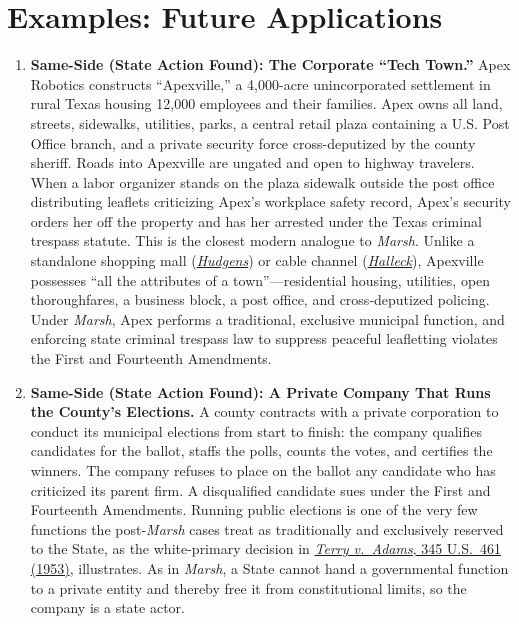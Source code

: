 \documentclass[12pt]{article}
\begin{document}
\section{Examples: Future Applications}
\begin{enumerate}

\item \textbf{Same-Side (State Action Found): The Corporate ``Tech Town.''} Apex Robotics constructs ``Apexville,'' a 4,000-acre unincorporated settlement in rural Texas housing 12,000 employees and their families. Apex owns all land, streets, sidewalks, utilities, parks, a central retail plaza containing a U.S. Post Office branch, and a private security force cross-deputized by the county sheriff. Roads into Apexville are ungated and open to highway travelers. When a labor organizer stands on the plaza sidewalk outside the post office distributing leaflets criticizing Apex's workplace safety record, Apex's security orders her off the property and has her arrested under the Texas criminal trespass statute. This is the closest modern analogue to \textit{Marsh}. Unlike a standalone shopping mall (\href{https://supreme.justia.com/cases/federal/us/424/507/}{\textit{Hudgens}}) or cable channel (\href{https://supreme.justia.com/cases/federal/us/587/17-1702/}{\textit{Halleck}}), Apexville possesses ``all the attributes of a town''---residential housing, utilities, open thoroughfares, a business block, a post office, and cross-deputized policing. Under \textit{Marsh}, Apex performs a traditional, exclusive municipal function, and enforcing state criminal trespass law to suppress peaceful leafletting violates the First and Fourteenth Amendments.

\item \textbf{Same-Side (State Action Found): A Private Company That Runs the County's Elections.} A county contracts with a private corporation to conduct its municipal elections from start to finish: the company qualifies candidates for the ballot, staffs the polls, counts the votes, and certifies the winners. The company refuses to place on the ballot any candidate who has criticized its parent firm. A disqualified candidate sues under the First and Fourteenth Amendments. Running public elections is one of the very few functions the post-\textit{Marsh} cases treat as traditionally and exclusively reserved to the State, as the white-primary decision in \href{https://supreme.justia.com/cases/federal/us/345/461/}{\textit{Terry v.\ Adams}, 345 U.S.\ 461 (1953)}, illustrates. As in \textit{Marsh}, a State cannot hand a governmental function to a private entity and thereby free it from constitutional limits, so the company is a state actor.


\end{enumerate}
\end{document}
